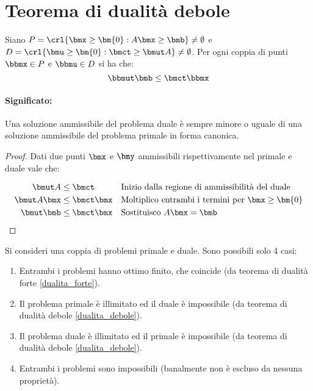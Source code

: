 \documentclass[\main/main.tex]{subfiles}
\begin{document}
\section{Teorema di dualità debole}
\begin{theorem}
  \label{dualita_debole}
  Siano $P=\crl{\bmx \geq \bm{0}: A\bmx \geq \bmb} \neq \emptyset$ e $D=\crl{\bmu \geq \bm{0}: \bmct \geq \bmut A} \neq \emptyset$. Per ogni coppia di punti $\bbmx \in P$ e $\bbmu \in D$ si ha che:
  \[
    \bbmut \bmb \leq \bmct\bbmx
  \]
  \paragraph*{Significato:} Una soluzione ammissibile del problema duale è sempre minore o uguale di una soluzione ammissibile del problema primale in forma canonica.
\end{theorem}

\begin{proof}
  Dati due punti $\bmx$ e $\bmy$ ammissibili rispettivamente nel primale e duale vale che:

  \begin{align*}
    \bmut A     & \leq \bmct     &  & \text{Inizio dalla regione di ammissibilità del duale}      \\
    \bmut A\bmx & \leq \bmct\bmx &  & \text{Moltiplico entrambi i termini per $\bmx \geq \bm{0}$} \\
    \bmut \bmb  & \leq \bmct\bmx &  & \text{Sostituisco $A\bmx = \bmb$}
  \end{align*}
\end{proof}

\begin{corollary}
  Si consideri una coppia di problemi primale e duale. Sono possibili solo 4 casi:
  \begin{enumerate}
    \item Entrambi i problemi hanno ottimo finito, che coincide (da teorema di dualità forte \ref{dualita_forte}).
    \item Il problema primale è illimitato ed il duale è impossibile (da teorema di dualità debole \ref{dualita_debole}).
    \item Il problema duale è illimitato ed il primale è impossibile (da teorema di dualità debole \ref{dualita_debole}).
    \item Entrambi i problemi sono impossibili (banalmente non è escluso da nessuna proprietà).
  \end{enumerate}
\end{corollary}
\end{document}
